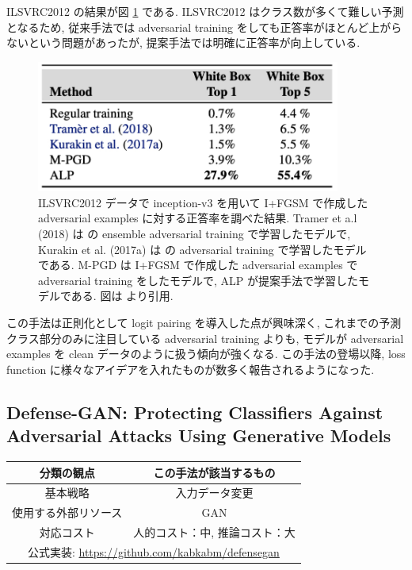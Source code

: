 ILSVRC2012 の結果が図 \ref{fig:adversarial-logit-result-imagenet} である.
ILSVRC2012 はクラス数が多くて難しい予測となるため, 従来手法では adversarial training をしても正答率がほとんど上がらないという問題があったが, 提案手法では明確に正答率が向上している.
%
\begin{figure}[htbp]
\begin{center}
\includegraphics[width=10.0cm]{figures/adversarial-logit-result-imagenet.pdf}
\end{center}
\caption{
ILSVRC2012 データで inception-v3 を用いて I+FGSM で作成した adversarial examples に対する正答率を調べた結果.
Tramer et a.l (2018) は \cite{tramer2017ensemble} の ensemble adversarial training で学習したモデルで, Kurakin et al. (2017a) は \cite{kurakin2016adversarial} の adversarial training で学習したモデルである.
M-PGD は I+FGSM で作成した adversarial examples で adversarial training をしたモデルで, ALP が提案手法で学習したモデルである.
図は \cite{kannan2018adversarial} より引用.
}
\label{fig:adversarial-logit-result-imagenet}
\end{figure}
%

この手法は正則化として logit pairing を導入した点が興味深く, これまでの予測クラス部分のみに注目している adversarial training よりも, モデルが adversarial examples を clean データのように扱う傾向が強くなる.
この手法の登場以降, loss function に様々なアイデアを入れたものが数多く報告されるようになった.



\subsection{Defense-GAN: Protecting Classifiers Against Adversarial Attacks Using Generative Models}
\label{subsec:defense-gan}
%
\begin{table}[htbp]
\begin{center}
\begin{tabular}{|c|c|}
\hline
分類の観点 & この手法が該当するもの \\
\hline
基本戦略 & 入力データ変更 \\
使用する外部リソース & GAN \\
対応コスト & 人的コスト：中, 推論コスト：大 \\
\hline
\multicolumn{2}{|c|}{公式実装: \href{https://github.com/kabkabm/defensegan}{https://github.com/kabkabm/defensegan}} \\
\hline
\end{tabular}
\label{tb:defense-gan-summary}
\end{center}
\end{table}
%

